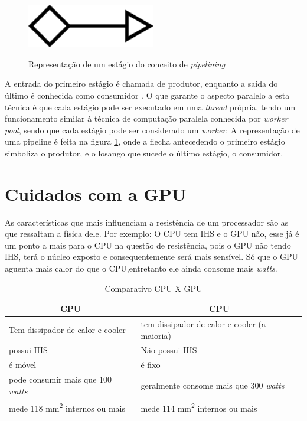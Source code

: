 \begin{figure}[!htb]
    \centering
    \caption{Representação de um estágio do conceito de \textit{pipelining}}
    \includegraphics[width=0.5\textwidth]{./dados/figuras/stage.png}
    \label{fig:stage}
\end{figure}
  
A entrada do primeiro estágio é chamada de produtor, enquanto a saída do último é conhecida como consumidor \cite{ajmani2014}. O que garante o aspecto paralelo a esta técnica é que cada estágio pode ser executado em uma \textit{thread} própria, tendo um funcionamento similar à técnica de computação paralela conhecida por \textit{worker pool}, sendo que cada estágio pode ser considerado um \textit{worker}. A representação de uma pipeline é feita na figura \ref{fig:stage}, onde a flecha antecedendo o primeiro estágio simboliza o produtor, e o losango que sucede o último estágio, o consumidor.
  
  \section{Cuidados com a GPU}

  As características que mais influenciam a resistência de um processador são as que ressaltam a física dele.
  Por exemplo: O CPU tem IHS e o GPU não, esse já é um ponto a mais para o CPU na questão de resistência, 
  pois o GPU não tendo IHS, terá o núcleo exposto e consequentemente será mais sensível.
  Só que o GPU aguenta mais calor do que o CPU,entretanto ele ainda consome mais \textit{watts}.

  \begin{table}[h!]
    \centering
    \caption{Comparativo CPU X GPU}
    \label{comparativo}
    \begin{tabular}{|l|l|}
      \hline
      \multicolumn{1}{|c|}{\textbf{CPU}}              &   \multicolumn{1}{c|}{\textbf{CPU}}            \\ \hline
      Tem dissipador de calor e cooler                &   tem dissipador de calor e cooler (a maioria)  \\ \hline
      possui IHS                                      &   Não possui IHS                                 \\ \hline
      é móvel                                         &   é fixo                                          \\ \hline
      pode consumir mais que 100 \textit{watts}       &   geralmente consome mais que 300 \textit{watts}   \\ \hline
      mede 118 mm\textsuperscript{2} internos ou mais &   mede 114 mm\textsuperscript{2} internos ou mais   \\ \hline
    \end{tabular}
  \end{table}


